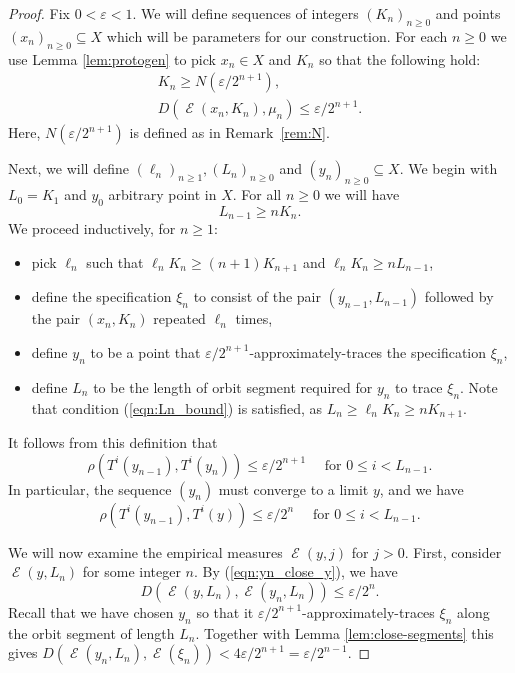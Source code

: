 \documentclass{amsart}
\theoremstyle{definition}
\DeclareMathOperator{\Emp}{\mathcal{E}}%
\newcommand{\eps}{\varepsilon}
\begin{document}
\begin{proof}
Fix $0< \eps < 1$.
We will define sequences of integers $(K_n)_{n\ge 0}$ and points
$(x_n)_{n\ge 0} \subseteq X$ which will be parameters for our construction. For each $n\ge 0$ we use Lemma \ref{lem:protogen}
to pick $x_n \in X$ and $K_n$
so that the following hold:
\begin{gather}
 K_n\ge N(\eps/2^{n+1}), \label{eqn:cond-x}\\
  D(\Emp(x_n,K_n),\mu_n) \le \eps/2^{n+1}.  \label{eqn:cond-i}
\end{gather}
Here, $N(\eps/2^{n+1})$ is defined as in Remark~\ref{rem:N}. %

Next, we will define $(\ell_n)_{n\ge 1}, (L_n)_{n \ge 0}$ and $(y_n)_{n \ge 0} \subseteq X$. We begin with $L_0 = K_1$ and $y_0$ arbitrary point in $X$. For all $n \ge 0$ we will have
\begin{equation} \label{eqn:Ln_bound}
L_{n-1} \ge n K_n.
\end{equation}
We proceed inductively, for $n \ge 1$:
\begin{itemize}
  \item pick $\ell_n$ such that $\ell_n K_n \ge (n + 1) K_{n+1}$ and $\ell_n K_n \ge n L_{n-1}$,
  \item define the specification $\xi_n$ to consist of the pair $(y_{n-1}, L_{n-1})$ followed by the pair $(x_n, K_n)$ repeated $\ell_n$ times,
  \item define $y_n$ to be a point that $\eps/2^{n+1}$-approximately-traces the specification $\xi_n$,
  \item define $L_n$ to be the length of orbit segment required for $y_n$ to trace $\xi_n$. Note that condition (\ref{eqn:Ln_bound}) is satisfied, as $L_n \ge \ell_n K_n \ge n K_{n+1}$.
\end{itemize}
It follows from this definition that
\begin{equation}
\rho(T^i(y_{n-1}), T^i(y_n)) \le \eps / 2^{n+1} \quad \textrm{ for } 0 \le i < L_{n-1}.
\end{equation}
In particular, the sequence $(y_n)$ must converge to a limit $y$, and we have
\begin{equation} \label{eqn:yn_close_y}
\rho(T^i(y_{n-1}), T^i(y)) \le \eps / 2^n \quad \textrm{ for } 0 \le i < L_{n-1}.
\end{equation}

We will now examine the empirical measures $\Emp(y, j)$ for $j>0$. First, consider $\Emp(y, L_n)$ for some integer $n$. By (\ref{eqn:yn_close_y}), we have
\begin{equation} \label{eqn:item1}
D(\Emp(y, L_n), \Emp(y_n, L_n)) \le \eps / 2^n.
\end{equation}
Recall that we have chosen $y_n$ so that it $\eps/2^{n+1}$-approximately-traces $\xi_n$ along the orbit segment of length $L_n$. Together with Lemma \ref{lem:close-segments} this gives $D(\Emp(y_n, L_n), \Emp(\xi_n)) < 4 \eps/2^{n+1} = \eps / 2^{n-1}$.


\end{proof}
\end{document}
